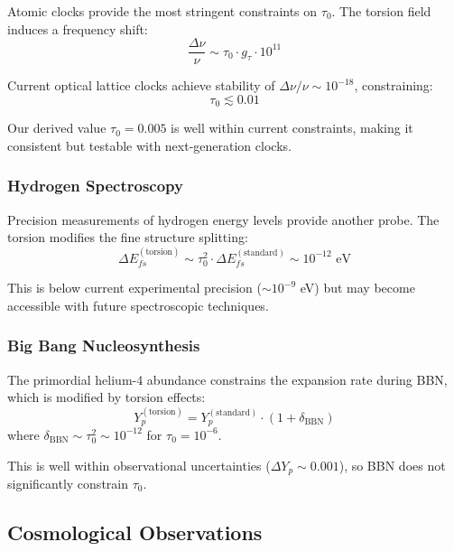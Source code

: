 Atomic clocks provide the most stringent constraints on $\tau_0$. The torsion field induces a frequency shift:
\begin{equation}
    \frac{\Delta \nu}{\nu} \sim \tau_0 \cdot g_\tau \cdot 10^{11}
\end{equation}

Current optical lattice clocks achieve stability of $\Delta\nu/\nu \sim 10^{-18}$, constraining:
\begin{equation}
    \tau_0 \lesssim 0.01
\end{equation}

Our derived value $\tau_0 = 0.005$ is well within current constraints, making it consistent but testable with next-generation clocks.

\subsubsection{Hydrogen Spectroscopy}

Precision measurements of hydrogen energy levels provide another probe. The torsion modifies the fine structure splitting:
\begin{equation}
    \Delta E_{fs}^{(\text{torsion})} \sim \tau_0^2 \cdot \Delta E_{fs}^{(\text{standard})} \sim 10^{-12} \text{ eV}
\end{equation}

This is below current experimental precision ($\sim 10^{-9}$ eV) but may become accessible with future spectroscopic techniques.

\subsubsection{Big Bang Nucleosynthesis}

The primordial helium-4 abundance constrains the expansion rate during BBN, which is modified by torsion effects:
\begin{equation}
    Y_p^{(\text{torsion})} = Y_p^{(\text{standard})} \cdot (1 + \delta_{\text{BBN}})
\end{equation}
where $\delta_{\text{BBN}} \sim \tau_0^2 \sim 10^{-12}$ for $\tau_0 = 10^{-6}$.

This is well within observational uncertainties ($\Delta Y_p \sim 0.001$), so BBN does not significantly constrain $\tau_0$.

\subsection{Cosmological Observations}

